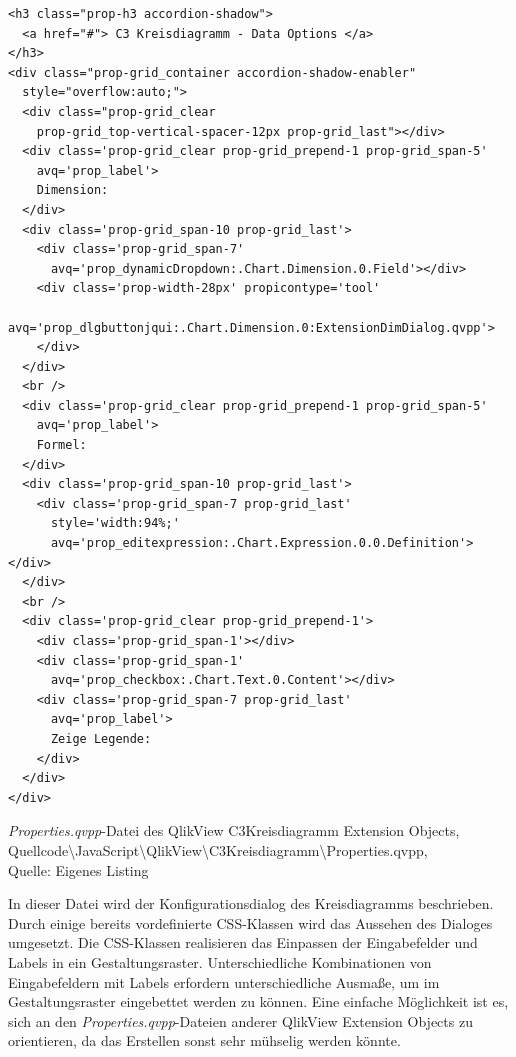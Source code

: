 \ifIncludeFigures\begin{listing}[htbp]
\begin{verbatim}
<h3 class="prop-h3 accordion-shadow">
  <a href="#"> C3 Kreisdiagramm - Data Options </a>
</h3>
<div class="prop-grid_container accordion-shadow-enabler"
  style="overflow:auto;">
  <div class="prop-grid_clear 
    prop-grid_top-vertical-spacer-12px prop-grid_last"></div>
  <div class='prop-grid_clear prop-grid_prepend-1 prop-grid_span-5'
    avq='prop_label'>
    Dimension:
  </div>
  <div class='prop-grid_span-10 prop-grid_last'>
    <div class='prop-grid_span-7' 
      avq='prop_dynamicDropdown:.Chart.Dimension.0.Field'></div>
    <div class='prop-width-28px' propicontype='tool'
      avq='prop_dlgbuttonjqui:.Chart.Dimension.0:ExtensionDimDialog.qvpp'>
    </div>
  </div>
  <br />
  <div class='prop-grid_clear prop-grid_prepend-1 prop-grid_span-5'
    avq='prop_label'>
    Formel:
  </div>
  <div class='prop-grid_span-10 prop-grid_last'>
    <div class='prop-grid_span-7 prop-grid_last'
      style='width:94%;' 
      avq='prop_editexpression:.Chart.Expression.0.0.Definition'></div>
  </div>
  <br />
  <div class='prop-grid_clear prop-grid_prepend-1'>
    <div class='prop-grid_span-1'></div>
    <div class='prop-grid_span-1' 
      avq='prop_checkbox:.Chart.Text.0.Content'></div>
    <div class='prop-grid_span-7 prop-grid_last'
      avq='prop_label'>
      Zeige Legende:
    </div>
  </div>
</div>
\end{verbatim}
\caption[\textit{Properties.qvpp}-Datei des QlikView C3Kreisdiagramm Extension Objects]{\textit{Properties.qvpp}-Datei des QlikView C3Kreisdiagramm Extension Objects, \\Quellcode\textbackslash{}JavaScript\textbackslash{}QlikView\textbackslash{}C3Kreisdiagramm\textbackslash{}Properties.qvpp, \\Quelle: Eigenes Listing}
\label{lst:JavascriptC3KreisdiagrammKonfigurationsdialogAusschnitt}
\end{listing}\fi

In dieser Datei wird der Konfigurations\-dialog des Kreis\-diagramms beschrieben. Durch einige bereits vordefinierte CSS-Klassen wird das Aussehen des Dialoges umgesetzt. Die CSS-Klassen realisieren das Einpassen der Eingabefelder und Labels in ein Gestaltungsraster. Unterschiedliche Kombinationen von Eingabefeldern mit Labels erfordern unterschiedliche Ausmaße, um im Gestaltungsraster eingebettet werden zu können. Eine einfache Möglich\-keit ist es, sich an den \textit{Properties.qvpp}-Dateien anderer QlikView Extension Objects zu orientieren, da das Erstellen sonst sehr mühselig werden könnte.

